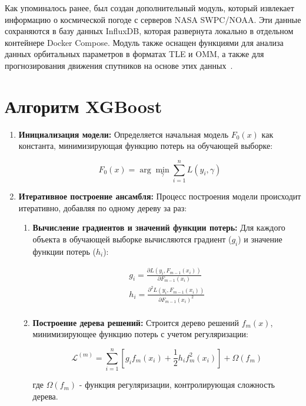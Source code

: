 \documentclass[14pt, a4paper]{extreport}
\begin{document}
    Как упоминалось ранее, был создан дополнительный модуль, который извлекает информацию о космической погоде с серверов NASA SWPC/NOAA. Эти данные сохраняются в базу данных InfluxDB, которая развернута локально в отдельном контейнере Docker Compose.
    Модуль также оснащен функциями для анализа данных орбитальных параметров в форматах TLE и OMM, а также для прогнозирования движения спутников на основе этих данных~\cite{bottou_1991_stochastic,killick_2012_optimal}.

    \section{Алгоритм XGBoost}

    \begin{enumerate}[label=\arabic*.]
        \item \textbf{Инициализация модели:}
        Определяется начальная модель $F_0(x)$ как константа, минимизирующая функцию потерь на обучающей выборке:

        \[F_0(x) = \arg \min_{\gamma} \sum_{i=1}^n L(y_i, \gamma)\]

        \item \textbf{Итеративное построение ансамбля:}
        Процесс построения модели происходит итеративно, добавляя по одному дереву за раз:
        \begin{enumerate}[label=\roman*.]
            \item \textbf{Вычисление градиентов и значений функции потерь:} Для каждого объекта в обучающей выборке вычисляются градиент ($g_i$) и значение функции потерь ($h_i$):

            \begin{gather*}
                g_i = \frac{\partial L(y_i, F_{m-1}(x_i))}{\partial F_{m-1}(x_i)}\\
                h_i = \frac{\partial^2 L(y_i, F_{m-1}(x_i))}{\partial F_{m-1}(x_i)^2}\\
            \end{gather*}

            \item \textbf{Построение дерева решений:} Строится дерево решений $f_m(x)$, минимизирующее функцию потерь с учетом регуляризации:

            \[\mathcal{L}^{(m)} = \sum_{i=1}^n \left[ g_i f_m(x_i) + \frac{1}{2} h_i f_m^2(x_i) \right] + \Omega(f_m)\]

            где $\Omega(f_m)$ - функция регуляризации, контролирующая сложность дерева.


\end{enumerate}
\end{enumerate}
\end{document}
